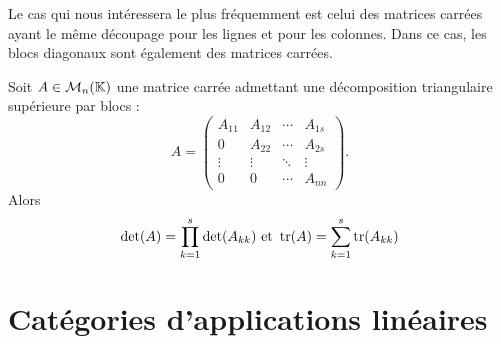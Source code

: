 \documentclass{book}
\begin{document}
\begin{Remarque}
Le cas qui nous intéressera le plus fréquemment est celui des matrices carrées ayant le même découpage pour les lignes et pour les colonnes. Dans ce cas, les blocs diagonaux sont également des matrices carrées.
\end{Remarque}
\begin{Proposition}
Soit $A\in  \mathcal{M}_{n}(\mathbb{K})$ une matrice carrée admettant une décomposition triangulaire supérieure par blocs :
$$A =\begin{pmatrix} {A} _{11}&{A} _{12}&\cdots &{A} _{1s}\\0& A_{22}&\cdots &{A} _{2s}\\\vdots &\vdots &\ddots &\vdots \\0&0&\cdots &A_{nn}\end{pmatrix}.$$
Alors $$ \mathop{\mathrm{det}}\nolimits(A) = \prod_{k=1}^s \mathop{\mathrm{det}}\nolimits(A_{kk}) \text{ et } \operatorname{tr}(A)= \sum_{k=1}^s \operatorname{tr}(A_{kk}) $$
\end{Proposition}

\section{Catégories d'applications linéaires}
\end{document}

